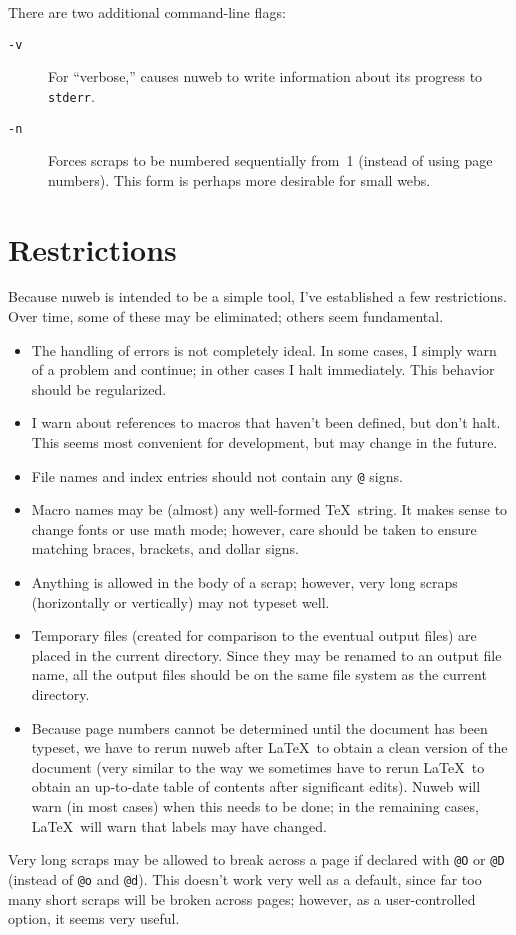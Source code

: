 There are two additional command-line flags:
\begin{description}
\item[\tt -v] For ``verbose,'' causes nuweb to write information about
  its progress to \verb|stderr|.
\item[\tt -n] Forces scraps to be numbered sequentially from~1
  (instead of using page numbers). This form is perhaps more desirable
  for small webs.
\end{description}


\section{Restrictions}

Because nuweb is intended to be a simple tool, I've established a few
restrictions. Over time, some of these may be eliminated; others seem
fundamental.
\begin{itemize}
\item The handling of errors is not completely ideal. In some cases, I
  simply warn of a problem and continue; in other cases I halt
  immediately. This behavior should be regularized.
\item I warn about references to macros that haven't been defined, but
  don't halt. This seems most convenient for development, but may change
  in the future.
\item File names and index entries should not contain any \verb|@|
  signs.
\item Macro names may be (almost) any well-formed \TeX\ string.
  It makes sense to change fonts or use math mode; however, care should
  be taken to ensure matching braces, brackets, and dollar signs.
\item Anything is allowed in the body of a scrap; however, very
  long scraps (horizontally or vertically) may not typeset well.
\item Temporary files (created for comparison to the eventual
  output files) are placed in the current directory. Since they may be
  renamed to an output file name, all the output files should be on the
  same file system as the current directory.
\item Because page numbers cannot be determined until the document has
  been typeset, we have to rerun nuweb after \LaTeX\ to obtain a clean
  version of the document (very similar to the way we sometimes have
  to rerun \LaTeX\ to obtain an up-to-date table of contents after
  significant edits).  Nuweb will warn (in most cases) when this needs
  to be done; in the remaining cases, \LaTeX\ will warn that labels
  may have changed.
\end{itemize}
Very long scraps may be allowed to break across a page if declared
with \verb|@O| or \verb|@D| (instead of \verb|@o| and \verb|@d|).
This doesn't work very well as a default, since far too many short
scraps will be broken across pages; however, as a user-controlled
option, it seems very useful.


